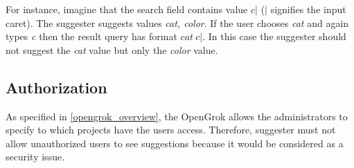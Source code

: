 For instance, imagine that the search field contains value $c\vert$ ($\vert$ signifies the input caret). The suggester
suggests values \textit{cat, color}. If the user chooses \textit{cat} and again types \textit{c} then the result
query has format $cat\ c\vert$. In this case the suggester should not suggest the \textit{cat} value but only the \textit{color}
value.

\subsection{Authorization}
As specified in \ref{opengrok_overview}, the OpenGrok allows the administrators to specify to which projects have the users
access. Therefore, suggester must not allow unauthorized users to see suggestions because it would be considered as a security issue.

